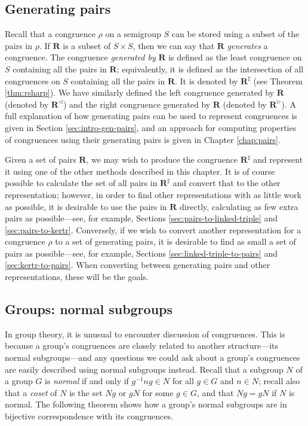 \subsection{Generating pairs}
Recall that a congruence $\rho$ on a semigroup $S$ can be stored using
a subset of the pairs in $\rho$.  If $\mathbf{R}$ is a subset of $S \times S$,
then we can say that $\mathbf{R}$ \textit{generates} a congruence.  The
congruence \textit{generated by} $\mathbf{R}$ is defined as the least congruence
on $S$ containing all the pairs in $\mathbf{R}$; equivalently, it is defined as
the intersection of all congruences on $S$ containing all the pairs in
$\mathbf{R}$.  It is denoted by $\mathbf{R}^\sharp$ (see Theorem
\ref{thm:rsharp}).  We have similarly defined the left congruence generated by
$\mathbf{R}$ (denoted by $\mathbf{R}^\triangleleft$) and the right congruence
generated by $\mathbf{R}$ (denoted by $\mathbf{R}^\triangleright$).
A full explanation of how generating pairs can be used to represent congruences
is given in Section \ref{sec:intro-gen-pairs}, and an approach for computing
properties of congruences using their generating pairs is given in Chapter
\ref{chap:pairs}.

Given a set of pairs $\mathbf{R}$, we may wish to produce the congruence
$\mathbf{R}^\sharp$ and represent it using one of the other methods described in
this chapter.  It is of course possible to calculate the set of all pairs in
$\mathbf{R}^\sharp$ and convert that to the other representation; however, in
order to find other representations with as little work as possible, it is
desirable to use the pairs in $\mathbf{R}$ directly, calculating as few extra
pairs as possible---see, for example, Sections \ref{sec:pairs-to-linked-triple}
and \ref{sec:pairs-to-kertr}.  Conversely, if we wish to convert another
representation for a congruence $\rho$ to a set of generating pairs, it is
desirable to find as small a set of pairs as possible---see, for example,
Sections \ref{sec:linked-triple-to-pairs} and \ref{sec:kertr-to-pairs}.  When
converting between generating pairs and other representations, these will be the
goals.

\subsection{Groups: normal subgroups}
\label{sec:normal-subgroups}

In group theory, it is unusual to encounter discussion of congruences.  This is
because a group's congruences are closely related to another structure---its
normal subgroups---and any questions we could ask about a group's congruences are
easily described using normal subgroups instead.  Recall that a subgroup $N$ of
a group $G$ is \textit{normal} if and only if $g^{-1}ng \in N$ for all $g \in G$
and $n \in N$; recall also that a \textit{coset} of $N$ is the set $Ng$ or $gN$
for some $g \in G$, and that $Ng=gN$ if $N$ is normal.  The following theorem
shows how a group's normal subgroups are in bijective correspondence with its
congruences.

